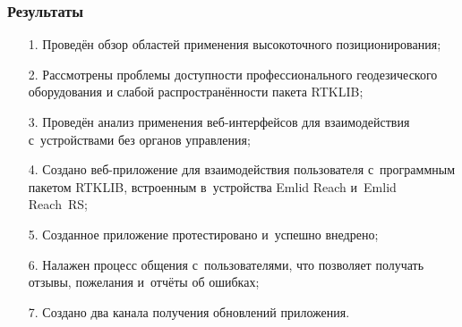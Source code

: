\documentclass[xetex,с,aspectratio=169]{beamer}
\begin{document}
%
%
\begin{frame}
  \frametitle{Результаты}

  \large

  \begin{itemize}
    \setlength\itemsep{0.5em}
    \item[1.] Проведён обзор областей применения высокоточного позиционирования;
    \item[2.] Рассмотрены проблемы доступности профессионального геодезического оборудования и слабой распространённости пакета RTKLIB;
    \item[3.] Проведён анализ применения веб-интерфейсов для взаимодействия с~устройствами без органов управления;
    \item[4.] Создано веб-приложение для взаимодействия пользователя с~программным пакетом RTKLIB, встроенным в~устройства Emlid Reach и~Emlid Reach~RS;
    \item[5.] Созданное приложение протестировано и~успешно внедрено;
    \item[6.] Налажен процесс общения с~пользователями, что позволяет получать отзывы, пожелания и~отчёты об ошибках;
    \item[7.] Создано два канала получения обновлений приложения.
  \end{itemize}
\end{frame}


%
%
{

  \begin{frame}[c]
    \begin{center}
      \Huge\bfseries
      \color{ifmoblue}{Спасибо за внимание}
    \end{center}
  \end{frame}
}
\end{document}
